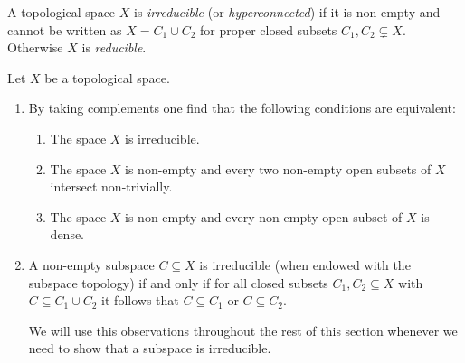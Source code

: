 \begin{definition}
  A topological space $X$ is \emph{irreducible} (or \emph{hyperconnected}) if it is non-empty and cannot be written as $X = C_1 \cup C_2$ for proper closed subsets $C_1, C_2 \subsetneq X$.
  Otherwise $X$ is \emph{reducible}.
\end{definition}


\begin{remark}
  Let $X$ be a topological space.
  \begin{enumerate}
    \item
      By taking complements one find that the following conditions are equivalent:
      \begin{enumerate}
        \item
          The space $X$ is irreducible.
        \item
          The space $X$ is non-empty and every two non-empty open subsets of $X$ intersect non-trivially.
        \item
          The space $X$ is non-empty and every non-empty open subset of $X$ is dense.
      \end{enumerate}
    \item
      A non-empty subspace $C \subseteq X$ is irreducible (when endowed with the subspace topology) if and only if for all closed subsets $C_1, C_2 \subseteq X$ with $C \subseteq C_1 \cup C_2$ it follows that $C \subseteq C_1$ or $C \subseteq C_2$.
      
      We will use this observations throughout the rest of this section whenever we need to show that a subspace is irreducible.
  \end{enumerate}
\end{remark}


% 
% 
%       



